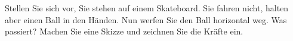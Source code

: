 

\begin{aufgabe}
	\label{skateboard}
	Stellen Sie sich vor, Sie stehen auf einem Skateboard. Sie fahren nicht, halten aber einen Ball in den Händen.
	Nun werfen Sie den Ball horizontal weg. Was passiert? Machen Sie eine Skizze und zeichnen Sie die Kräfte ein. 
\end{aufgabe}
